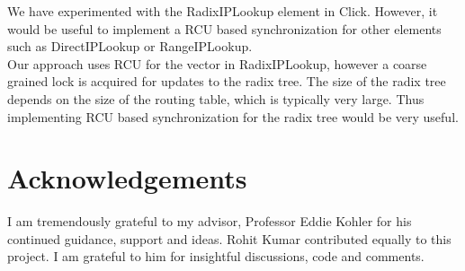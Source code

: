 \documentclass[a4paper,marginparwidth=50pt,marginparsep=10pt]{article}
\begin{document}
We have experimented with the RadixIPLookup element in Click. However, it would be useful to implement a RCU based synchronization for other elements such as DirectIPLookup or RangeIPLookup.\\ 

Our approach uses RCU for the vector in RadixIPLookup, however a coarse grained lock is acquired for updates to the radix tree. The size of the radix tree depends on the size of the routing table, which is typically very large. Thus implementing RCU based synchronization for the radix tree would be very useful.
\section{Acknowledgements}
I am tremendously grateful to my advisor, Professor Eddie Kohler for his continued guidance, support and ideas.
Rohit Kumar contributed equally to this project. I am grateful to him for insightful discussions, code and comments.


\end{document}
